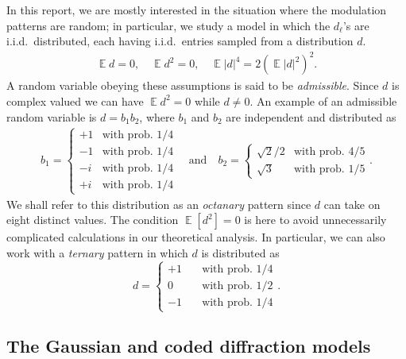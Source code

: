 \documentclass[conference,onecolumn,12pt]{IEEEtran}
\newcommand{\abs}[1]{\left|#1\right|}
\newcommand{\<}{\langle}
\renewcommand{\>}{\rangle}
\newcommand{\E}{\operatorname{\mathbb{E}}}
\numberwithin{equation}{section}
\begin{document}
  In this report, we are mostly interested in the situation where the
  modulation patterns are random; in particular, we study a model in
  which the $d_\ell$'s are i.i.d.~distributed, each having
  i.i.d.~entries sampled from a distribution $d$.
\begin{align}
\label{momentcond}
\E d = 0, \quad \E d^2 = 0,\quad \E \abs{d}^4 =2{(\E \abs{d}^2)}^2.
\end{align}
A random variable obeying these assumptions is said to be {\em
  admissible}.  Since $d$ is complex valued we can have $\E d^2 = 0$
while $d \neq 0$. An example of an admissible random variable is $d =
b_1 b_2$, where $b_1$ and $b_2$ are independent and distributed as
\begin{align}
\label{eq:octanary}
b_1=\begin{cases}
 +1&\text{with prob.~} {1}/{4}\\
-1&\text{with prob.~} {1}/{4}\\
-i&\text{with prob.~} {1}/{4}\\
+i&\text{with prob.~} {1}/{4}
\end{cases}
\quad \text{and} \quad b_2=\begin{cases}
  \sqrt{2}/2 & \text{with prob.~}  {4}/{5}\\
\sqrt{3} & \text{with prob.~}  {1}/{5}
\end{cases}.
\end{align}
We shall refer to this distribution as an {\em octanary} pattern since
$d$ can take on eight distinct values.  The condition $\E[d^2]=0$ is
here to avoid unnecessarily complicated calculations in our
theoretical analysis.  In particular, we can also work with a {\em
  ternary} pattern in which $d$ is distributed as
\begin{equation}
\label{eq:ternary}
d=\begin{cases}
+1 &\quad\text{with prob.~} {1}/{4}\\
0  &\quad\text{with prob.~} {1}/{2}\\
-1 &\quad\text{with prob.~} {1}/{4}
\end{cases}. 
\end{equation}




\subsection{The Gaussian and coded diffraction models}
\end{document}
